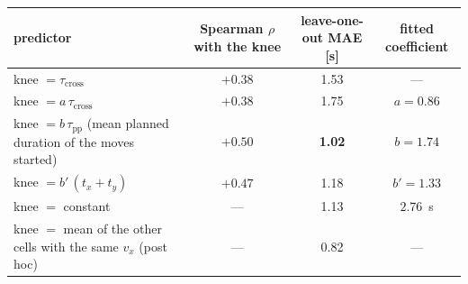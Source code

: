 \begin{tabular}{@{}lccc@{}}
\toprule
predictor & Spearman $\rho$ with the knee & leave-one-out MAE [s] & fitted coefficient \\
\midrule
knee $=\tau_{\mathrm{cross}}$ & $+0.38$ & 1.53 & --- \\
knee $=a\,\tau_{\mathrm{cross}}$ & $+0.38$ & 1.75 & $a=0.86$ \\
knee $=b\,\tau_{\mathrm{pp}}$ (mean planned duration of the moves started) & $+0.50$ & \textbf{1.02} & $b=1.74$ \\
knee $=b'\,(t_x+t_y)$ & $+0.47$ & 1.18 & $b'=1.33$ \\
knee $=$ constant & --- & 1.13 & $2.76$~s \\
knee $=$ mean of the other cells with the same $v_x$ (post hoc) & --- & 0.82 & --- \\
\bottomrule
\end{tabular}
